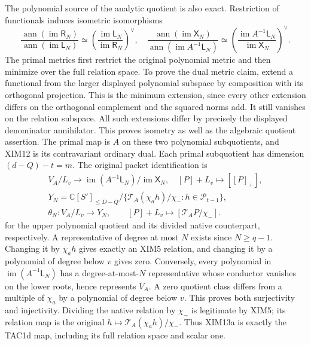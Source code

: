 The polynomial source of the analytic quotient is also exact.
Restriction of functionals induces isometric isomorphisms
\[
 \frac{\operatorname{ann}(\operatorname{im}\mathsf R_N)}
      {\operatorname{ann}(\operatorname{im}\mathsf L_N)}
   \simeq
 \left(\frac{\operatorname{im}\mathsf L_N}
               {\operatorname{im}\mathsf R_N}\right)^\vee,
 \quad
 \frac{\operatorname{ann}(\operatorname{im}\mathsf X_N)}
      {\operatorname{ann}(\operatorname{im}A^{-1}\mathsf L_N)}
   \simeq
 \left(\frac{\operatorname{im}A^{-1}\mathsf L_N}
               {\operatorname{im}\mathsf X_N}\right)^\vee.
 \tag{XIM13}
\]
The primal metrics first restrict the original polynomial metric and
then minimize over the full relation space. To prove the dual metric
claim, extend a functional from the larger displayed polynomial
subspace by composition with its orthogonal projection. This is the
minimum extension, since every other extension differs on the
orthogonal complement and the squared norms add. It still vanishes
on the relation subspace. All such extensions differ by precisely
the displayed denominator annihilator. This proves isometry as well
as the algebraic quotient assertion. The primal map is $A$ on these
two polynomial subquotients, and XIM12 is its contravariant ordinary
dual. Each primal subquotient has dimension $(d-Q)-t=m$.
The original packet identification is
\[
\begin{gathered}
 V_A/L_v\longrightarrow
 \operatorname{im}(A^{-1}\mathsf L_N)/\operatorname{im}\mathsf X_N,
 \quad [P]+L_v\longmapsto[[P]_+],\\
 Y_N=\mathbb C[S']_{\le D-Q}\big/
   \{\mathcal T_A(\chi_a h)/\chi_-:h\in\mathcal P_{t-1}\},\\
 \theta_N:V_A/L_v\longrightarrow Y_N,\qquad
 [P]+L_v\longmapsto[\mathcal T_AP/\chi_-].
\end{gathered}
 \tag{XIM13a}
\]
for the upper polynomial quotient and its divided native counterpart,
respectively. A representative of degree at most $N$ exists since
$N\ge q-1$. Changing it by $\chi_a h$ gives exactly an XIM5 relation,
and changing it by a polynomial of degree below $v$ gives zero.
Conversely, every polynomial in $\operatorname{im}(A^{-1}\mathsf L_N)$
has a degree-at-most-$N$ representative whose conductor vanishes on
the lower roots, hence represents $V_A$. A zero quotient class differs
from a multiple of $\chi_a$ by a polynomial of degree below $v$.
This proves both surjectivity and injectivity. Dividing the native
relation by $\chi_-$ is legitimate by XIM5; its relation map is the
original $h\mapsto\mathcal T_A(\chi_a h)/\chi_-$. Thus XIM13a is
exactly the TAC1d map, including its full relation space and scalar one.


